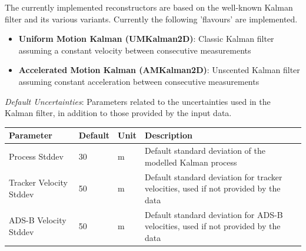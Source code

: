 The currently implemented reconstructors are based on the well-known Kalman filter and its various variants.
Currently the following 'flavours' are implemented. \\

\begin{itemize}
    \item \textbf{Uniform Motion Kalman (UMKalman2D)}: 
        Classic Kalman filter assuming a constant velocity between consecutive measurements
    \item \textbf{Accelerated Motion Kalman (AMKalman2D)}: 
        Unscented Kalman filter assuming constant acceleration between consecutive measurements \\
\end{itemize}

\textit{Default Uncertainties}: Parameters related to the uncertainties used in the Kalman filter, in addition to those provided 
by the input data.
\begin{table}[H]
    \center
    \begin{tabularx}{\textwidth}{ | l | l | l | X |}
        \hline
        \textbf{Parameter} & \textbf{Default} & \textbf{Unit} & \textbf{Description} \\ \hline
        Process Stddev & 30 & m & Default standard deviation of the modelled Kalman process \\ \hline
        Tracker Velocity Stddev & 50 & m & Default standard deviation for tracker velocities, 
            used if not provided by the data \\ \hline
        ADS-B Velocity Stddev & 50 & m & Default standard deviation for ADS-B velocities, 
            used if not provided by the data \\ \hline
    \end{tabularx}
\end{table}

